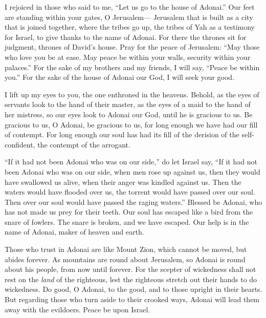 \begin{biblechapter} %
 I rejoiced in those who said to me, 
“Let us go to the house of Adonai.”
\verse Our feet are standing 
within your gates, O Jerusalem—
\verse Jerusalem that is built 
as a city that is joined together,
\verse where the tribes go up, 
the tribes of Yah as a testimony for Israel, 
to give thanks to the name of Adonai.
\verse For there the thrones sit for judgment, 
thrones of David’s house.
\verse Pray for the peace of Jerusalem: 
“May those who love you be at ease.
\verse May peace be within your walls, 
security within your palaces.”
\verse For the sake of my brothers and my friends, 
I will say, “Peace be within you.”
\verse For the sake of the house of Adonai our God, 
I will seek your good.
\end{biblechapter}

\begin{biblechapter} %
 I lift up my eyes to you, 
the one enthroned in the heavens.
\verse Behold, as the eyes of servants 
look to the hand of their master, 
as the eyes of a maid to the hand of her mistress, 
so our eyes look to Adonai our God, 
until he is gracious to us.
\verse Be gracious to us, O Adonai, be gracious to us, 
for long enough we have had our fill of contempt.
\verse For long enough our soul has had its fill of 
the derision of the self-confident, 
the contempt of the arrogant.
\end{biblechapter}

\begin{biblechapter} %
 “If it had not been Adonai who was on our side,” 
do let Israel say,
\verse “If it had not been Adonai who was on our side, 
when men rose up against us,
\verse then they would have swallowed us alive, 
when their anger was kindled against us.
\verse Then the waters would have flooded over us, 
the torrent would have passed over our soul.
\verse Then over our soul would have passed 
the raging waters.”
\verse Blessed be Adonai, 
who has not made us prey for their teeth.
\verse Our soul has escaped like a bird 
from the snare of fowlers. 
The snare is broken, and we have escaped.
\verse Our help is in the name of Adonai, 
maker of heaven and earth.
\end{biblechapter}

\begin{biblechapter} %
 Those who trust in Adonai 
are like Mount Zion, which cannot be moved, 
but abides forever.
\verse As mountains are round about Jerusalem, 
so Adonai is round about his people, 
from now until forever.
\verse For the scepter of wickedness shall not rest 
on the \textit{land} of the righteous, 
lest the righteous stretch out 
their hands to do wickedness.
\verse Do good, O Adonai, to the good, 
and to those upright in their hearts.
\verse But regarding those who turn aside to their crooked ways, 
Adonai will lead them away with the evildoers. 
Peace be upon Israel.
\end{biblechapter}

